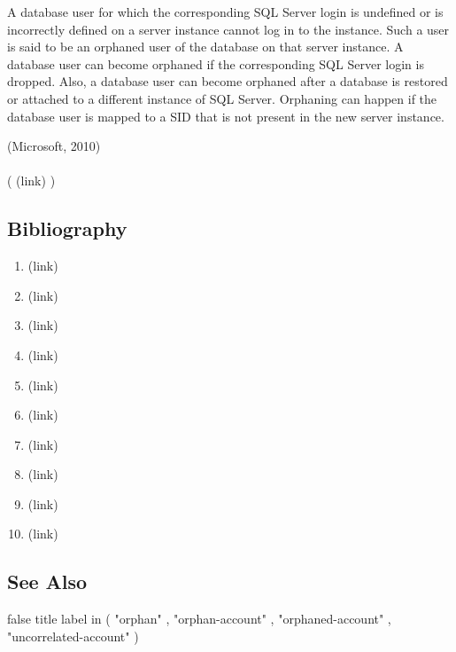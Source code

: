 \begin{DIC_BlockQuote} A database user for which the corresponding SQL Server login is undefined or is incorrectly defined on a server instance cannot log in to the instance. Such a user is said to be an orphaned user of the database on that server instance. A database user can become orphaned if the corresponding SQL Server login is dropped. Also, a database user can become orphaned after a database is restored or attached to a different instance of SQL Server. Orphaning can happen if the database user is mapped to a SID that is not present in the new server instance.  \end{DIC_BlockQuote} (Microsoft, 2010)  \paragraph{} (  (link) \href{Microsoft, 2010 }{ } )  \subsection*{Bibliography } \begin{enumerate} \item  (link) \href{Diodati and Ruddy, 2017 }{ } \item  (link) \href{Donaldson et al., 2015 }{ }   \item  (link) \href{ETSI GS ISI 002, 2013 }{ }   \item  (link) \href{Gazos and Osmanoglu, 2013 }{ }   \item  (link) \href{Haber and Rolls, 2020 }{ } \item  (link) \href{Hurakadli and Sridhar, 2012 }{ } \item  (link) \href{Kuppinger and Hill, 2020 }{ } \item  (link) \href{Mello, 2020 }{ }   \item  (link) \href{Microsoft, 2010 }{ } \item  (link) \href{Proctor et al., 2017 }{ } \end{enumerate} \subsection*{See Also } false  title  label in ( "orphan" , "orphan-account" , "orphaned-account" , "uncorrelated-account" )  